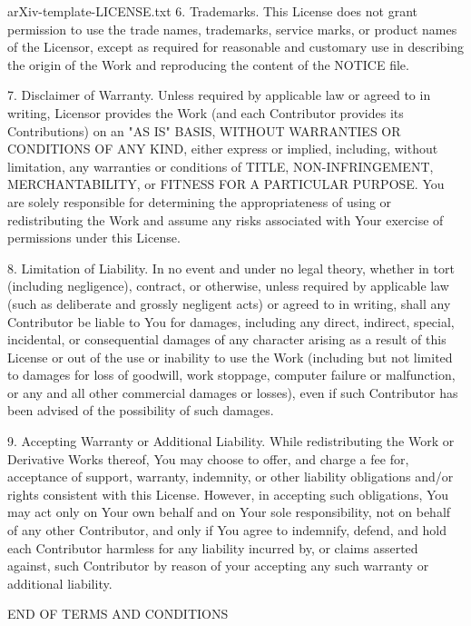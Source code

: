 \begin{filecontents*}{arXiv-template-LICENSE.txt}
   6. Trademarks. This License does not grant permission to use the trade
      names, trademarks, service marks, or product names of the Licensor,
      except as required for reasonable and customary use in describing the
      origin of the Work and reproducing the content of the NOTICE file.

   7. Disclaimer of Warranty. Unless required by applicable law or
      agreed to in writing, Licensor provides the Work (and each
      Contributor provides its Contributions) on an "AS IS" BASIS,
      WITHOUT WARRANTIES OR CONDITIONS OF ANY KIND, either express or
      implied, including, without limitation, any warranties or conditions
      of TITLE, NON-INFRINGEMENT, MERCHANTABILITY, or FITNESS FOR A
      PARTICULAR PURPOSE. You are solely responsible for determining the
      appropriateness of using or redistributing the Work and assume any
      risks associated with Your exercise of permissions under this License.

   8. Limitation of Liability. In no event and under no legal theory,
      whether in tort (including negligence), contract, or otherwise,
      unless required by applicable law (such as deliberate and grossly
      negligent acts) or agreed to in writing, shall any Contributor be
      liable to You for damages, including any direct, indirect, special,
      incidental, or consequential damages of any character arising as a
      result of this License or out of the use or inability to use the
      Work (including but not limited to damages for loss of goodwill,
      work stoppage, computer failure or malfunction, or any and all
      other commercial damages or losses), even if such Contributor
      has been advised of the possibility of such damages.

   9. Accepting Warranty or Additional Liability. While redistributing
      the Work or Derivative Works thereof, You may choose to offer,
      and charge a fee for, acceptance of support, warranty, indemnity,
      or other liability obligations and/or rights consistent with this
      License. However, in accepting such obligations, You may act only
      on Your own behalf and on Your sole responsibility, not on behalf
      of any other Contributor, and only if You agree to indemnify,
      defend, and hold each Contributor harmless for any liability
      incurred by, or claims asserted against, such Contributor by reason
      of your accepting any such warranty or additional liability.

   END OF TERMS AND CONDITIONS


\end{filecontents*}
